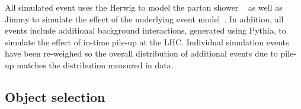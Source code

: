 
All simulated event uses the {\sc Herwig} to model the parton shower ~\cite{herwig1,Corcella:2002jc}
as well as {\sc Jimmy} to simulate the effect of the underlying event model~\cite{jimmy}.
In addition, all events include additional background interactions, generated using Pythia,
to simulate the effect of in-time pile-up at the LHC.
Individual simulation events have been re-weighed so the overall distribution of
additional events due to pile-up matches the distribution measured in data.




\subsection{Object selection}
\label{s:object}

